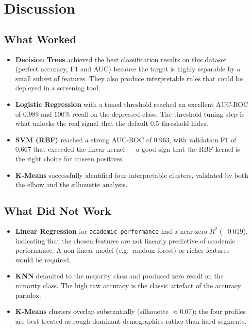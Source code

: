 \documentclass[11pt,a4paper]{article}
\begin{document}
\section{Discussion}

\subsection{What Worked}
\begin{itemize}[leftmargin=*, itemsep=2pt]
    \item \textbf{Decision Trees} achieved the best classification results on
        this dataset (perfect accuracy, F1 and AUC) because the target is
        highly separable by a small subset of features. They also produce
        interpretable rules that could be deployed in a screening tool.
    \item \textbf{Logistic Regression} with a tuned threshold reached an
        excellent AUC-ROC of $0.989$ and $100\%$ recall on the depressed
        class. The threshold-tuning step is what unlocks the real signal
        that the default $0.5$ threshold hides.
    \item \textbf{SVM (RBF)} reached a strong AUC-ROC of $0.963$, with
        validation F1 of $0.667$ that exceeded the linear kernel — a
        good sign that the RBF kernel is the right choice for unseen
        positives.
    \item \textbf{K-Means} successfully identified four interpretable
        clusters, validated by both the elbow and the silhouette analysis.
\end{itemize}

\subsection{What Did Not Work}
\begin{itemize}[leftmargin=*, itemsep=2pt]
    \item \textbf{Linear Regression} for \texttt{academic\_performance} had
        a near-zero $R^2$ ($-0.019$), indicating that the chosen features
        are not linearly predictive of academic performance. A non-linear
        model (e.g.\ random forest) or richer features would be required.
    \item \textbf{KNN} defaulted to the majority class and produced
        zero recall on the minority class. The high raw accuracy is the
        classic artefact of the accuracy paradox.
    \item \textbf{K-Means} clusters overlap substantially (silhouette
        $\approx 0.07$); the four profiles are best treated as rough
        dominant demographics rather than hard segments.
\end{itemize}
\end{document}
